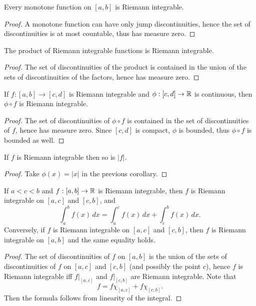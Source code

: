 \begin{cl}
    Every monotone function on $[a, b]$ is Riemann integrable.
    \begin{proof}
        A monotone function can have only jump discontinuities, hence the set of discontinuities is at most countable, thus has measure zero. 
    \end{proof}
\end{cl}

\begin{cl}
    The product of Riemann integrable functions is Riemann integrable.
    \begin{proof}
        The set of discontinuities of the product is contained in the union of the sets of discontinuities of the factors, hence has measure zero. 
    \end{proof}
\end{cl}

\begin{cl}
    If $f: [a, b] \to [c, d]$ is Riemann integrable and $\phi: [c, d] \to {\mathbb R}$ is continuous, then $\phi \circ f$ is Riemann integrable.
    \begin{proof}
        The set of discontinuities of $\phi \circ f$ is contained in the set of discontinuities of $f$, hence has measure zero. Since $[c, d]$ is compact, $\phi$ is bounded, thus $\phi \circ f$ is bounded as well.
    \end{proof}
\end{cl}

\begin{cl}
    If $f$ is Riemann integrable then so is $|f|$.
    \begin{proof}
        Take $\phi(x) = |x|$ in the previous corollary.
    \end{proof}
\end{cl}

\begin{cl}
    If $a < c < b$ and $f: [a, b] \to {\mathbb R}$ is Riemann integrable, then $f$ is Riemann integrable on $[a, c]$ and $[c, b]$, and
    \[
    \int_a^b f(x) \, dx = \int_a^c f(x) \, dx + \int_c^b f(x) \, dx.
    \]
    Conversely, if $f$ is Riemann integrable on $[a, c]$ and $[c, b]$, then $f$ is Riemann integrable on $[a, b]$ and the same equality holds.
    \begin{proof}
        The set of discontinuities of $f$ on $[a, b]$ is the union of the sets of discontinuities of $f$ on $[a, c]$ and $[c, b]$ (and possibly the point $c$), hence $f$ is Riemann integrable iff $f|_{[a, c]}$ and $f|_{[c, b]}$ are Riemann integrable. Note that
        \[
        f = f \chi_{[a, c]} + f \chi_{[c, b]}.
        \]
        Then the formula follows from linearity of the integral.
    \end{proof}
\end{cl}

